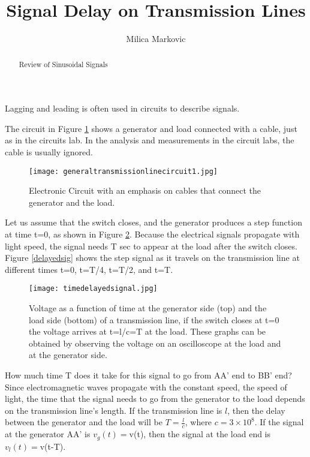 \documentclass{ximera}
\title{Signal Delay on Transmission Lines}
\author{Milica Markovic}
\begin{document}
  
\begin{abstract}  
Review of Sinusoidal Signals
\end{abstract}  
\maketitle




Lagging and leading is often used in circuits to describe signals.

The circuit in Figure \ref{elcric} shows a generator and load connected with a cable, just as in the circuits lab. In the analysis and measurements in the circuit labs, the cable is usually ignored. 



\begin{figure}[htbp]
\begin{center}
\texttt{[image: generaltransmissionlinecircuit1.jpg]}
\end{center}
\caption{Electronic Circuit with an emphasis on cables that connect the generator and the load.}
\label{elcric}
\end{figure}

Let us assume that the switch closes, and the generator produces a step function at time t=0, as shown in Figure  \ref{timedelaysig}. Because the electrical signals propagate with light speed, the signal needs T sec to appear at the load after the switch closes. Figure \ref{delayedsig} shows the step signal as it travels on the transmission line at different times t=0, t=T/4, t=T/2, and t=T.


\begin{figure}[htbp]
\begin{center}
\texttt{[image: timedelayedsignal.jpg]}  
\end{center}
\caption{Voltage as a function of time at the generator side (top) and the load side (bottom) of a transmission line, if the switch closes at t=0 the voltage arrives at t=l/c=T at the load. These graphs can be obtained by observing the voltage on an oscilloscope at the load and at the generator side.}
\label{timedelaysig} 
 \end{figure}





 How much time T does it take for this signal to go from AA' end to BB' end? 
Since electromagnetic waves propagate with the constant speed, the speed of light,  the time that the signal needs to go from the generator to the load depends on the transmission line's length. If the transmission line is $l$, then the delay between the generator and the load will be  $T=\frac{l}{c}$, where $c=3\times 10^8$. If the signal at the generator AA' is $v_g(t)=$v(t), then the signal at the load end is $v_l(t)=$v(t-T). 
\end{document}
